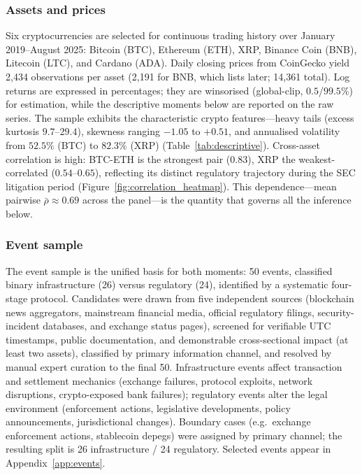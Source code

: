 \documentclass[pdflatex,sn-mathphys-num]{sn-jnl}
\theoremstyle{thmstyleone}
\theoremstyle{thmstyletwo}
\theoremstyle{thmstylethree}
\begin{document}
\subsubsection{Assets and prices}

Six cryptocurrencies are selected for continuous trading history over January 2019--August 2025: Bitcoin (BTC), Ethereum (ETH), XRP, Binance Coin (BNB), Litecoin (LTC), and Cardano (ADA). Daily closing prices from CoinGecko yield 2,434 observations per asset (2,191 for BNB, which lists later; 14,361 total). Log returns are expressed in percentages; they are winsorised (global-clip, $0.5$/$99.5\%$) for estimation, while the descriptive moments below are reported on the raw series. The sample exhibits the characteristic crypto features---heavy tails (excess kurtosis $9.7$--$29.4$), skewness ranging $-1.05$ to $+0.51$, and annualised volatility from $52.5\%$ (BTC) to $82.3\%$ (XRP) (Table~\ref{tab:descriptive}). Cross-asset correlation is high: BTC-ETH is the strongest pair ($0.83$), XRP the weakest-correlated ($0.54$--$0.65$), reflecting its distinct regulatory trajectory during the SEC litigation period (Figure~\ref{fig:correlation_heatmap}). This dependence---mean pairwise $\bar\rho \approx 0.69$ across the panel---is the quantity that governs all the inference below.

\subsubsection{Event sample}

The event sample is the unified basis for both moments: 50 events, classified binary infrastructure (26) versus regulatory (24), identified by a systematic four-stage protocol. Candidates were drawn from five independent sources (blockchain news aggregators, mainstream financial media, official regulatory filings, security-incident databases, and exchange status pages), screened for verifiable UTC timestamps, public documentation, and demonstrable cross-sectional impact (at least two assets), classified by primary information channel, and resolved by manual expert curation to the final 50. Infrastructure events affect transaction and settlement mechanics (exchange failures, protocol exploits, network disruptions, crypto-exposed bank failures); regulatory events alter the legal environment (enforcement actions, legislative developments, policy announcements, jurisdictional changes). Boundary cases (e.g.\ exchange enforcement actions, stablecoin depegs) were assigned by primary channel; the resulting split is 26 infrastructure / 24 regulatory. Selected events appear in Appendix~\ref{app:events}.
\end{document}
